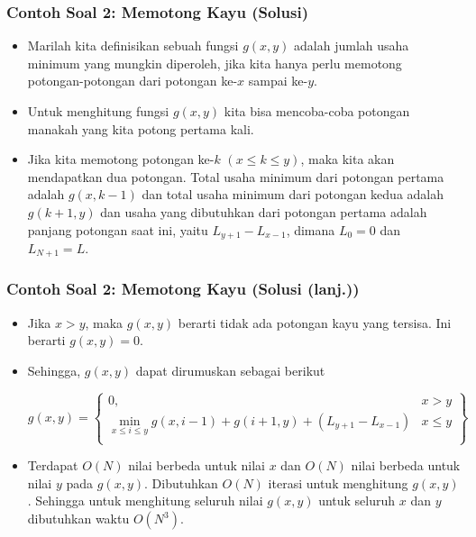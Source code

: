 \begin{frame}
\frametitle{Contoh Soal 2: Memotong Kayu (Solusi)}
\begin{itemize}
  \item Marilah kita definisikan sebuah fungsi $g(x,y)$ adalah jumlah usaha minimum yang mungkin diperoleh, jika kita hanya perlu memotong potongan-potongan dari potongan ke-$x$ sampai ke-$y$.
  \item Untuk menghitung fungsi $g(x,y)$ kita bisa mencoba-coba potongan manakah yang kita potong pertama kali.
  \item Jika kita memotong potongan ke-$k$ $(x \leq k \leq y)$, maka kita akan mendapatkan dua potongan. Total usaha minimum dari potongan pertama adalah $g(x,k-1)$ dan total usaha minimum dari potongan kedua adalah $g(k+1,y)$ dan usaha yang dibutuhkan dari potongan pertama adalah panjang potongan saat ini, yaitu $L_{y+1} - L_{x-1}$, dimana $L_0 = 0$ dan $L_{N+1} = L$.
\end{itemize}
\end{frame}

\begin{frame} 
\frametitle{Contoh Soal 2: Memotong Kayu (Solusi (lanj.))}
\begin{itemize}
  \item Jika $x>y$, maka $g(x,y)$ berarti tidak ada potongan kayu yang tersisa. Ini berarti $g(x,y) = 0$.
  \item Sehingga, $g(x,y)$ dapat dirumuskan sebagai berikut
  \begin{small}
  \[g(x,y) = \left\{\begin{array}{lr}
        0, & x>y\\
        \min_{x \leq i \leq y} g(x,i-1) + g(i+1,y) + (L_{y+1} - L_{x-1}) & x \leq y \\
        \end{array}\right\}\]
  \end{small}
  \item Terdapat $O(N)$ nilai berbeda untuk nilai $x$ dan $O(N)$ nilai berbeda untuk nilai $y$ pada $g(x,y)$. Dibutuhkan $O(N)$ iterasi untuk menghitung $g(x,y)$. Sehingga untuk menghitung seluruh nilai $g(x,y)$ untuk seluruh $x$ dan $y$ dibutuhkan waktu $O(N^3)$.
\end{itemize}
\end{frame}

